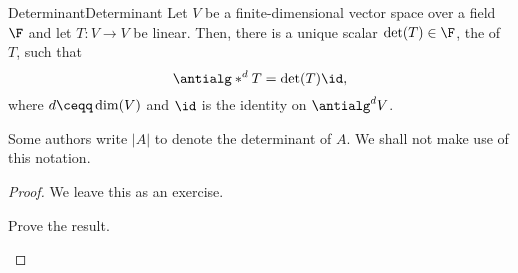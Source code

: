 \begin{thm}{Determinant}{Determinant}
	Let $V$ be a finite-dimensional vector space over a field $\F$ and let $T\colon V\rightarrow V$ be linear.  Then, there is a unique scalar $\det (T)\in \F$, the  of $T$, such that
	\begin{equation}
	\antialg* ^dT=\det (T)\id ,
	\end{equation}
	where $d\ceqq \dim (V)$ and $\id$ is the identity on $\antialg ^dV$.
	\begin{rmk}
		Some authors write $|A|$ to denote the determinant of $A$.  We shall not make use of this notation.
	\end{rmk}
	\begin{proof}
		We leave this as an exercise.
		\begin{exr}[breakable=false]{}{}
			Prove the result.
		\end{exr}
	\end{proof}
\end{thm}